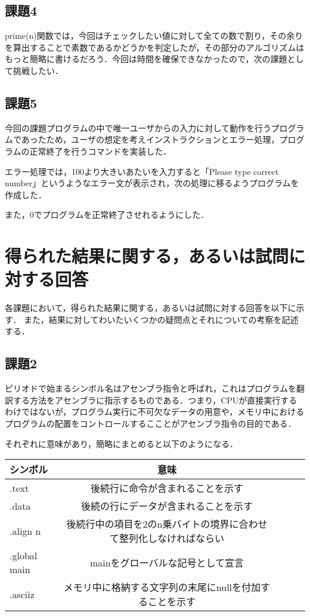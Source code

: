 \documentclass[a4j]{jarticle}
\begin{document}
\subsection{課題4}

prime(n)関数では，今回はチェックしたい値に対して全ての数で割り，その余りを算出することで素数であるかどうかを判定したが，その部分のアルゴリズムはもっと簡略に書けるだろう．今回は時間を確保できなかったので，次の課題として挑戦したい．


\subsection{課題5}

今回の課題プログラムの中で唯一ユーザからの入力に対して動作を行うプログラムであったため，ユーザの想定を考えインストラクションとエラー処理，プログラムの正常終了を行うコマンドを実装した．

エラー処理では，100より大きいあたいを入力すると「Please type correct number」というようなエラー文が表示され，次の処理に移るようプログラムを作成した．

また，0でプログラムを正常終了させれるようにした．





%
%

\section{得られた結果に関する，あるいは試問に対する回答}


各課題において，得られた結果に関する，あるいは試問に対する回答を以下に示す．
また，結果に対してわいたいくつかの疑問点とそれについての考察を記述する．


\subsection{課題2}

ピリオドで始まるシンボル名はアセンブラ指令と呼ばれ，これはプログラムを翻訳する方法をアセンブラに指示するものである．つまり，CPUが直接実行するわけではないが，プログラム実行に不可欠なデータの用意や，メモリ中におけるプログラムの配置をコントロールするこことがアセンブラ指令の目的である．

それぞれに意味があり，簡略にまとめると以下のようになる．

\begin{center}
\begin{tabular}{lclcl}\hline
シンボル&意味\\ \hline \hline
.text&後続行に命令が含まれることを示す\\ \hline
.data&後続の行にデータが含まれることを示す\\ \hline
.align n&後続行中の項目を2のn乗バイトの境界に合わせて整列化しなければならい\\ \hline
.global main&mainをグローバルな記号として宣言\\ \hline
.asciiz&メモリ中に格納する文字列の末尾にnullを付加することを示す\\ \hline
\end{tabular}
\end{center}
\end{document}
